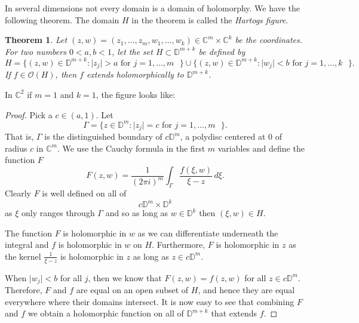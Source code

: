 \documentclass[12pt,openany]{book}
\newcommand{\sabs}[1]{\lvert {#1} \rvert}
\newcommand{\C}{{\mathbb{C}}}
\newcommand{\D}{{\mathbb{D}}}
\newcommand{\sO}{{\mathcal{O}}}
\newcommand{\myindex}[1]{#1\index{#1}}
\theoremstyle{plain}
\newtheorem{thm}{Theorem}[section]
\theoremstyle{remark}
\theoremstyle{definition}
\theoremstyle{exercise}
\theoremstyle{example}
\begin{document}
In several dimensions not every domain is a domain of holomorphy.  We have
the following theorem.  The domain $H$ in the theorem is called the
\emph{\myindex{Hartogs figure}}.

\begin{thm}
Let $(z,w) = (z_1,\ldots,z_m,w_{1},\ldots,w_{k}) \in \C^m \times \C^k$ be the coordinates.  For two numbers
$0 < a,b < 1$, let the set $H \subset \D^{m+k}$
be defined by
\begin{equation*}
H = \{ (z,w) \in \D^{m+k} : \sabs{z_j} > a \text{ for $j=1,\ldots,m$ } \} \cup
\{ (z,w) \in \D^{m+k} : \sabs{w_j} < b \text{ for $j=1,\ldots,k$ } \} .
\end{equation*}
If $f \in \sO(H)$, then $f$ extends holomorphically to $\D^{m+k}$.
\end{thm}

In $\C^2$ if $m=1$ and $k=1$, the figure looks like:


\newcommand{\hartogstext}{\parbox[t]{2.5in}{In diagrams, often the Hartogs figure is
drawn as:}}
\begin{center}

\end{center}



\begin{proof}
Pick a $c \in (a,1)$.  Let
\begin{equation*}
\Gamma =
\{ z \in \D^{m} : \sabs{z_j} = c \text{ for $j=1,\ldots,m$ } \}.
\end{equation*}
That is, $\Gamma$ is the distinguished boundary of $c \D^m$,
a polydisc centered at 0 of radius $c$ in $\C^m$.
We use the Cauchy formula in the first $m$ variables and
define the function $F$
\begin{equation*}
F(z,w)
=
\frac{1}{{(2\pi i)}^m}
\int_\Gamma \frac{f(\xi,w)}{\xi-z} \, d\xi .
\end{equation*}
Clearly $F$ is well defined on all of
\begin{equation*}
c\D^m \times \D^k
\end{equation*}
as $\xi$ only
ranges through $\Gamma$ and so as long as $w \in \D^k$ then $(\xi,w) \in H$.

The function $F$ is holomorphic in $w$ as we can differentiate
underneath the integral and $f$ is holomorphic in $w$ on $H$.  Furthermore,
$F$ is holomorphic in $z$ as the kernel $\frac{1}{\xi-z}$ is holomorphic in
$z$ as long as $z \in c\D^m$.

When $\sabs{w_j} < b$ for all $j$, then we know that $F(z,w) = f(z,w)$
for all $z \in c \D^m$.  Therefore, $F$ and $f$ are equal on an open subset
of $H$, and hence they are equal everywhere where their domains intersect.
It is now easy to see that combining $F$ and $f$ we obtain a holomorphic
function on all of $\D^{m+k}$ that extends $f$.
\end{proof}
\end{document}

